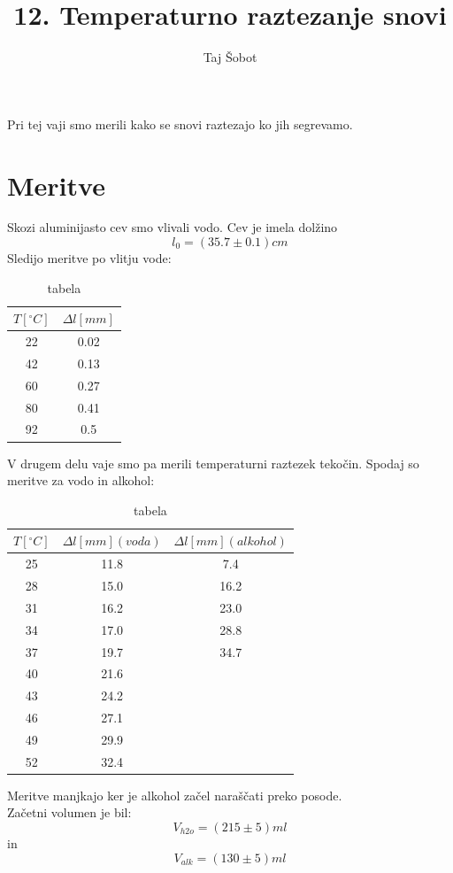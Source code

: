 \documentclass[11pt]{article}
\title{12. Temperaturno raztezanje snovi}
\author{Taj Šobot}
\begin{document}
    \maketitle
    \flushleft

    Pri tej vaji smo merili kako se snovi raztezajo ko jih segrevamo.

    \section{Meritve}
    Skozi aluminijasto cev smo vlivali vodo.
    Cev je imela dolžino
    \[
        l_0 = (35.7 \pm 0.1) cm
    \]
    Sledijo meritve po vlitju vode:

    \begin{table}[h!]
        \centering
        \begin{tabular}{|c|c|}
            \hline
            $T [^\circ C]$ & $\Delta l [mm] $ \\
            \hline
            22 & 0.02  \\
            42 & 0.13  \\
            60 & 0.27  \\
            80 & 0.41  \\
            92 & 0.5   \\
            \hline
        \end{tabular}
        \caption{tabela}
        \label{tab:1}
    \end{table}

    V drugem delu vaje smo pa merili temperaturni raztezek tekočin.
    Spodaj so meritve za vodo in alkohol:
    \begin{table}[h!]
        \centering
        \begin{tabular}{|c|c|c|}
            \hline
            $T [^\circ C]$ & $\Delta l [mm] (voda)$ & $\Delta l [mm] (alkohol)$ \\
            \hline
            25 & 11.8 &  7.4 \\
            28 & 15.0 & 16.2 \\
            31 & 16.2 & 23.0 \\
            34 & 17.0 & 28.8 \\
            37 & 19.7 & 34.7 \\
            40 & 21.6 &      \\
            43 & 24.2 &      \\
            46 & 27.1 &      \\
            49 & 29.9 &      \\
            52 & 32.4 &      \\
            \hline
        \end{tabular}
        \caption{tabela}
        \label{tab:2}
    \end{table}
    Meritve manjkajo ker je alkohol začel naraščati preko posode.
    \\
    Začetni volumen je bil:
    \[
        V_{h2o} = (215 \pm 5) ml
    \]
    in
    \[
        V_{alk} = (130 \pm 5) ml
    \]
\end{document}
